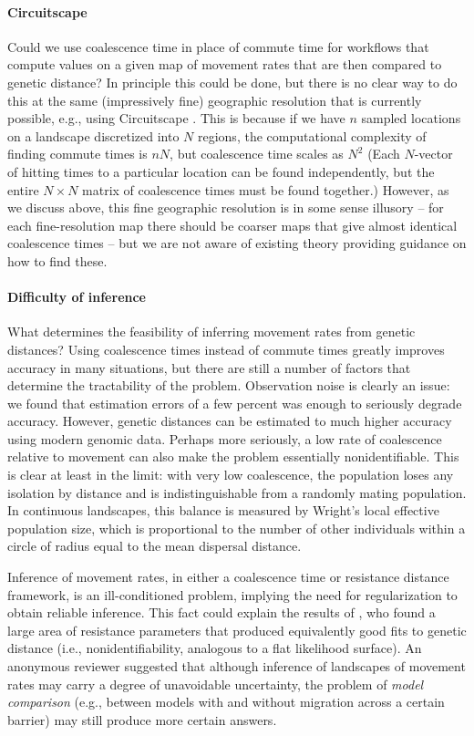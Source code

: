 \documentclass{article}
\begin{document}
\paragraph{Circuitscape} 
Could we use coalescence time in place of commute time
for workflows that compute values on a given map of movement rates
that are then compared to genetic distance?
In principle this could be done,
but there is no clear way to do this 
at the same (impressively fine) geographic resolution that is currently possible,
e.g., using Circuitscape \citep{mcrae2006isolation}.
This is because if we have $n$ sampled locations
on a landscape discretized into $N$ regions,
the computational complexity of finding commute times is $nN$,
but coalescence time scales as $N^2$
(Each $N$-vector of hitting times to a particular location can be found independently,
but the entire $N \times N$ matrix of coalescence times must be found together.)
However, as we discuss above, this fine geographic resolution is in some sense illusory --
for each fine-resolution map there should be coarser maps that give almost identical coalescence times --
but we are not aware of existing theory providing guidance on how to find these.

\paragraph{Difficulty of inference}
What determines the feasibility of inferring movement rates from genetic distances?
Using coalescence times instead of commute times greatly improves accuracy in many situations,
but there are still a number of factors that determine the tractability of the problem.
Observation noise is clearly an issue:
we found that estimation errors of a few percent was enough to seriously degrade accuracy.
However, genetic distances can be estimated to much higher accuracy using modern genomic data.
Perhaps more seriously,
a low rate of coalescence relative to movement can also make the problem essentially nonidentifiable.
This is clear at least in the limit: with very low coalescence, 
the population loses any isolation by distance and is indistinguishable from a randomly mating population.
In continuous landscapes, this balance is measured by Wright's local effective population size,
which is proportional to the number of other individuals 
within a circle of radius equal to the mean dispersal distance.

Inference of movement rates, in either a coalescence time or resistance distance framework,
is an ill-conditioned problem,
implying the need for regularization to obtain reliable inference.
This fact could explain the results of \citet{graves2013current},
who found a large area of resistance parameters
that produced equivalently good fits to genetic distance
(i.e., nonidentifiability, analogous to a flat likelihood surface).
An anonymous reviewer suggested
that although inference of landscapes of movement rates may carry a degree of unavoidable uncertainty,
the problem of \emph{model comparison} 
(e.g., between models with and without migration across a certain barrier)
may still produce more certain answers. 
\end{document}
